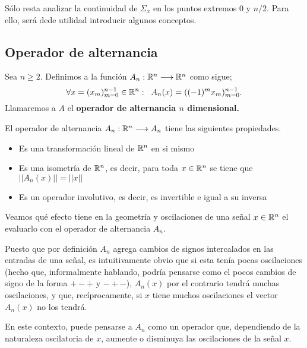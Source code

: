 Sólo resta analizar la continuidad de 
$\Sigma_{x}$ en los puntos extremos $0$ y $n/2$.
Para ello,
será dede utilidad introducir algunos conceptos.

\subsection{Operador de alternancia}

\begin{defi}
Sea $n \geq 2$. Definimos a la función 
$A_{n}: \mathbb{R}^{n} \longrightarrow \mathbb{R}^{n}$ como sigue;
\[
\forall x= (x_{m})_{m=0}^{n-1} \in \mathbb{R}^{n}: \hspace{0.2cm}
A_{n}(x) = ((-1)^{m}x_{m})_{m=0}^{n-1}.
\]
Llamaremos a $A$ el \textbf{operador de alternancia $n$ dimensional.}
\end{defi}


\begin{obs}
El operador de alternancia $A_{n}: \mathbb{R}^{n} \longrightarrow A_{n}$
tiene las siguientes propiedades.
\begin{itemize}
\item Es una transformación lineal de $\mathbb{R}^{n}$ en si mismo
\item Es una isometría de $\mathbb{R}^{n}$, es decir, para toda
$x \in \mathbb{R}^{n}$ se tiene que $|| A_{n}(x) || = || x ||$
\item Es un operador involutivo, es decir, es invertible e igual
a su inversa
\end{itemize}
\end{obs}

\begin{ejemplo}
Veamos qué efecto tiene en la geometría y oscilaciones
de una señal $x \in \mathbb{R}^{n}$ el evaluarlo con el operador 
de alternancia $A_{n}$.

Puesto que por definición $A_{n}$ agrega cambios de signos
intercalados en las entradas de una señal, es intuitivamente
obvio que si esta tenía pocas oscilaciones (hecho que,
informalmente hablando, podría pensarse como el pocos cambios
de signo de la forma $+-+$ y $-+-$), $A_{n}(x)$ por el contrario
tendrá muchas oscilaciones, y que, recíprocamente,
si $x$ tiene muchos oscilaciones el vector $A_{n}(x)$ no los tendrá.

En este contexto, puede pensarse a $A_{n}$ como un operador
que, dependiendo de la naturaleza oscilatoria de $x$, aumente
o disminuya las oscilaciones de la señal $x$. 

\end{ejemplo}

